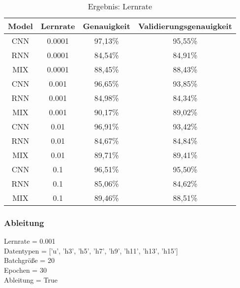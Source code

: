     \begin{table}[H]
        \centering
        \begin{tabular}{|c|c|c|c|}
            \hline
            Model & Lernrate & Genauigkeit & Validierungsgenauigkeit \\
            \hline
            CNN & 0.0001 & 97,13\% & 95,55\% \\
            \hline
            RNN & 0.0001 & 84,54\% & 84,91\% \\
            \hline
            MIX & 0.0001 & 88,45\% & 88,43\% \\
            \hline
            \hline
            CNN & 0.001  & 96,65\% & 93,85\% \\
            \hline
            RNN & 0.001  & 84,98\% & 84,34\% \\
            \hline
            MIX & 0.001  & 90,17\% & 89,02\% \\
            \hline
            \hline
            CNN & 0.01   & 96,91\% & 93,42\% \\
            \hline
            RNN & 0.01   & 84,67\% & 84,84\% \\
            \hline
            MIX & 0.01   & 89,71\% & 89,41\% \\
            \hline
            \hline
            CNN & 0.1    & 96,51\% & 95,50\% \\
            \hline
            RNN & 0.1    & 85,06\% & 84,62\% \\
            \hline
            MIX & 0.1    & 89,46\% & 88,51\% \\
            \hline
        \end{tabular}
        \caption{Ergebnis: Lernrate}
        \label{tabl:ErgebnisLernrate}
    \end{table}

    \subsubsection{Ableitung}

    Lernrate = 0.001\\
    \noindent
    Datentypen = ['u', 'h3', 'h5', 'h7', 'h9', 'h11', 'h13', 'h15']\\
    \noindent
    Batchgröße = 20\\
    \noindent
    Epochen = 30\\
    \noindent
    Ableitung = True\\

